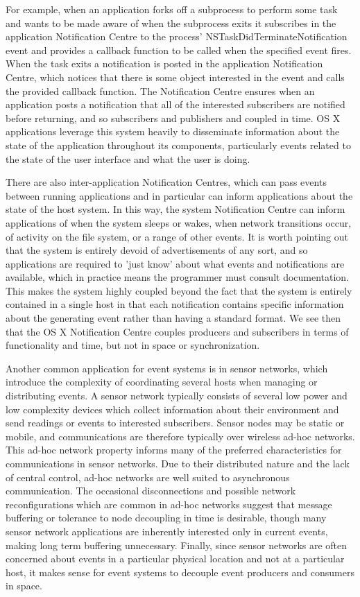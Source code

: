 \documentclass{acm_proc_article-sp}
\begin{document}
For example, when an application forks off a subprocess to perform some task and wants to be made aware of when the subprocess exits it subscribes in the application Notification Centre to the process' NSTaskDidTerminateNotification event and provides a callback function to be called when the specified event fires. When the task exits a notification is posted in the application Notification Centre, which notices that there is some object interested in the event and calls the provided callback function. The Notification Centre ensures when an application posts a notification that all of the interested subscribers are notified before returning, and so subscribers and publishers and coupled in time. OS X applications leverage this system heavily to disseminate information about the state of the application throughout its components, particularly events related to the state of the user interface and what the user is doing. 

There are also inter-application Notification Centres, which can pass events between running applications and in particular can inform applications about the state of the host system. In this way, the system Notification Centre can inform applications of when the system sleeps or wakes, when network transitions occur, of activity on the file system, or a range of other events. It is worth pointing out that the system is entirely devoid of advertisements of any sort, and so applications are required to 'just know' about what events and notifications are available, which in practice means the programmer must consult documentation. This makes the system highly coupled beyond the fact that the system is entirely contained in a single host in that each notification contains specific information about the generating event rather than having a standard format. We see then that the OS X Notification Centre couples producers and subscribers in terms of functionality and time, but not in space or synchronization. 


Another common application for event systems is in sensor networks, which introduce the complexity of coordinating several hosts when managing or distributing events. A sensor network typically consists of several low power and low complexity devices which collect information about their environment and send readings or events to interested subscribers. Sensor nodes may be static or mobile, and communications are therefore typically over wireless ad-hoc networks. This ad-hoc network property informs many of the preferred characteristics for communications in sensor networks. Due to their distributed nature and the lack of central control, ad-hoc networks are well suited to asynchronous communication. The occasional disconnections and possible network reconfigurations which are common in ad-hoc networks suggest that message buffering or tolerance to node decoupling in time is desirable, though many sensor network applications are inherently interested only in current events, making long term buffering unnecessary. Finally, since sensor networks are often concerned about events in a particular physical location and not at a particular host, it makes sense for event systems to decouple event producers and consumers in space. 
\end{document}
